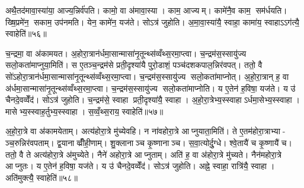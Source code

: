 अथै॒तद॑मावा॒स्या॑या॒ आज्य॒न्निर्व॑पति। कामो॒ वा अ॑मावा॒स्या। काम॒ आज्यम्। कामे॑नै॒व काम॒ सम॑र्धयति। ख्षि॒प्रमे॑न॒ सकाम॒ उप॑नमति। येन॒ कामे॑न॒ यज॑ते। सोऽत्र॑ जुहोति। अ॒मा॒वा॒स्या॑यै॒ स्वाहा॒ कामा॑य॒ स्वाहाऽऽग॑त्यै॒ स्वाहेति॑॥५६॥


च॒न्द्रमा॒ वा अ॑कामयत। अ॒होरा॒त्रान॑र्धमा॒सान्मासा॑नृ॒तून्थ्स॑व्वँथ्स॒रमा॒प्त्वा। च॒न्द्रम॑स॒स्सायु॑ज्य सलो॒कता॑माप्नुया॒मिति॑। स ए॒तञ्च॒न्द्रम॑से प्रती॒दृश्या॑यै पुरो॒डाशं॒ पञ्च॑दशकपाल॒न्निर॑वपत्। ततो॒ वै सो॑ऽहोरा॒त्रान॑र्धमा॒सान्मासा॑नृ॒तून्थ्स॑व्वँथ्स॒रमा॒प्त्वा। च॒न्द्रम॑स॒स्सायु॑ज्य सलो॒कता॑माप्नोत्। अ॒हो॒रा॒त्रान् ह॒ वा अ॑र्धमा॒सान्मासा॑नृ॒तून्थ्स॑व्वँथ्स॒रमा॒प्त्वा। च॒न्द्रम॑स॒स्सायु॑ज्य सलो॒कता॑माप्नोति। य ए॒तेन॑ ह॒विषा॒ यज॑ते। य उ॑ चैनदे॒वव्वेँद॑। सोऽत्र॑ जुहोति। च॒न्द्रम॑से॒ स्वाहा प्रती॒दृश्या॑यै॒ स्वाहा। अ॒हो॒रा॒त्रेभ्य॒स्स्वाहाऽर्धमा॒सेभ्य॒स्स्वाहा। मासेभ्य॒स्स्वाह॒र्तुभ्य॒स्स्वाहा। स॒व्वँ॒थ्स॒राय॒ स्वाहेति॑॥५७॥

अ॒हो॒रा॒त्रे वा अ॑कामयेताम्। अत्य॑होरा॒त्रे मु॑च्येवहि। न ना॑वहोरा॒त्रे आप्नुयाता॒मिति॑। ते ए॒तम॑होरा॒त्राभ्या- ञ्च॒रुन्निर॑वपताम्। द्व॒यानाव्व्रीँही॒णाम्। शु॒क्लानाञ्च कृ॒ष्णानाञ्च। स॒वा॒त्योर्दु॒ग्धे। श्वे॒तायै॑ च कृ॒ष्णायै॑ च। ततो॒ वै ते अत्य॑होरा॒त्रे अ॑मुच्येते। नैने॑ अहोरा॒त्रे आप्नुताम्। अति॑ ह॒ वा अ॑होरा॒त्रे मु॑च्यते। नैन॑महोरा॒त्रे आप्नुतः। य ए॒तेन॑ ह॒विषा॒ यज॑ते। य उ॑ चैनदे॒वव्वेँद॑। सोऽत्र॑ जुहोति। अह्ने॒ स्वाहा॒ रात्रि॑यै॒ स्वाहा। अति॑मुक्त्यै॒ स्वाहेति॑॥५८॥

